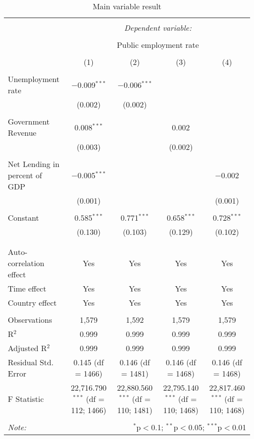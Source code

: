 
\begin{table}[!htbp] \centering 
  \caption{Main variable result} 
  \label{} 
\begin{tabular}{@{\extracolsep{5pt}}lcccc} 
\\[-1.8ex]\hline 
\hline \\[-1.8ex] 
 & \multicolumn{4}{c}{\textit{Dependent variable:}} \\ 
\cline{2-5} 
\\[-1.8ex] & \multicolumn{4}{c}{Public employment rate} \\ 
\\[-1.8ex] & (1) & (2) & (3) & (4)\\ 
\hline \\[-1.8ex] 
 Unemployment rate & $-$0.009$^{***}$ & $-$0.006$^{***}$ &  &  \\ 
  & (0.002) & (0.002) &  &  \\ 
  & & & & \\ 
 Government Revenue & 0.008$^{***}$ &  & 0.002 &  \\ 
  & (0.003) &  & (0.002) &  \\ 
  & & & & \\ 
 Net Lending in percent of GDP & $-$0.005$^{***}$ &  &  & $-$0.002 \\ 
  & (0.001) &  &  & (0.001) \\ 
  & & & & \\ 
 Constant & 0.585$^{***}$ & 0.771$^{***}$ & 0.658$^{***}$ & 0.728$^{***}$ \\ 
  & (0.130) & (0.103) & (0.129) & (0.102) \\ 
  & & & & \\ 
\hline \\[-1.8ex] 
Auto-correlation effect & Yes & Yes & Yes & Yes \\ 
Time effect & Yes & Yes & Yes & Yes \\ 
Country effect & Yes & Yes & Yes & Yes \\ 
\hline \\[-1.8ex] 
Observations & 1,579 & 1,592 & 1,579 & 1,579 \\ 
R$^{2}$ & 0.999 & 0.999 & 0.999 & 0.999 \\ 
Adjusted R$^{2}$ & 0.999 & 0.999 & 0.999 & 0.999 \\ 
Residual Std. Error & 0.145 (df = 1466) & 0.146 (df = 1481) & 0.146 (df = 1468) & 0.146 (df = 1468) \\ 
F Statistic & 22,716.790$^{***}$ (df = 112; 1466) & 22,880.560$^{***}$ (df = 110; 1481) & 22,795.140$^{***}$ (df = 110; 1468) & 22,817.460$^{***}$ (df = 110; 1468) \\ 
\hline 
\hline \\[-1.8ex] 
\textit{Note:}  & \multicolumn{4}{r}{$^{*}$p$<$0.1; $^{**}$p$<$0.05; $^{***}$p$<$0.01} \\ 
\end{tabular} 
\end{table} 
